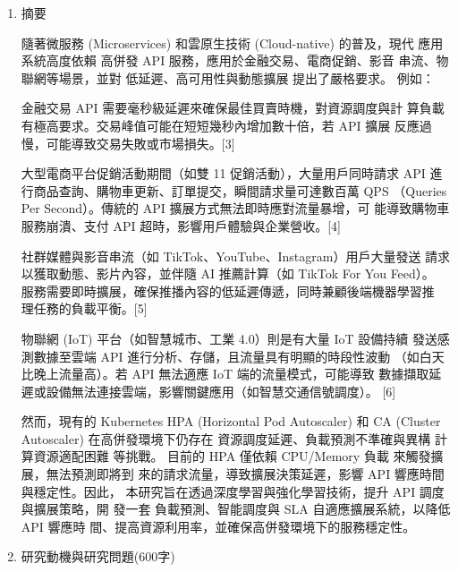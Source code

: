 \documentclass[12pt,a4paper]{article}
\begin{document}
\setlength{\parindent}{2em}


\begin{enumerate}[label={(\zhdig*)}, leftmargin=2\parindent, listparindent=\parindent]

\item 摘要

    隨著微服務 (Microservices) 和雲原生技術 (Cloud-native) 的普及，現代
    應用系統高度依賴 高併發 API 服務，應用於金融交易、電商促銷、影音
    串流、物聯網等場景，並對 低延遲、高可用性與動態擴展 提出了嚴格要求。
    例如：

    金融交易 API 需要毫秒級延遲來確保最佳買賣時機，對資源調度與計
    算負載有極高要求。交易峰值可能在短短幾秒內增加數十倍，若 API 擴展
    反應過慢，可能導致交易失敗或市場損失。[3]

    大型電商平台促銷活動期間（如雙 11 促銷活動），大量用戶同時請求
    API 進行商品查詢、購物車更新、訂單提交，瞬間請求量可達數百萬 QPS
    （Queries Per Second）。傳統的 API 擴展方式無法即時應對流量暴增，可
    能導致購物車服務崩潰、支付 API 超時，影響用戶體驗與企業營收。[4]

    社群媒體與影音串流（如 TikTok、YouTube、Instagram）用戶大量發送
    請求以獲取動態、影片內容，並伴隨 AI 推薦計算（如 TikTok For You Feed）。
    服務需要即時擴展，確保推播內容的低延遲傳遞，同時兼顧後端機器學習推
    理任務的負載平衡。[5]

    物聯網 (IoT) 平台（如智慧城市、工業 4.0）則是有大量 IoT 設備持續
    發送感測數據至雲端 API 進行分析、存儲，且流量具有明顯的時段性波動
    （如白天比晚上流量高）。若 API 無法適應 IoT 端的流量模式，可能導致
    數據擷取延遲或設備無法連接雲端，影響關鍵應用（如智慧交通信號調度）。
    [6]

    然而，現有的 Kubernetes HPA (Horizontal Pod Autoscaler) 和 CA (Cluster
    Autoscaler) 在高併發環境下仍存在 資源調度延遲、負載預測不準確與異構
    計算資源適配困難 等挑戰。
    目前的 HPA 僅依賴 CPU/Memory 負載 來觸發擴展，無法預測即將到
    來的請求流量，導致擴展決策延遲，影響 API 響應時間與穩定性。因此，
    本研究旨在透過深度學習與強化學習技術，提升 API 調度與擴展策略，開
    發一套 負載預測、智能調度與 SLA 自適應擴展系統，以降低 API 響應時
    間、提高資源利用率，並確保高併發環境下的服務穩定性。

\item 研究動機與研究問題(600字)\label{研究動機}

\begin{enumerate}[label={(\arabic*)}, leftmargin=\parindent, listparindent=\parindent]


\end{enumerate}
\end{enumerate}
\end{document}

